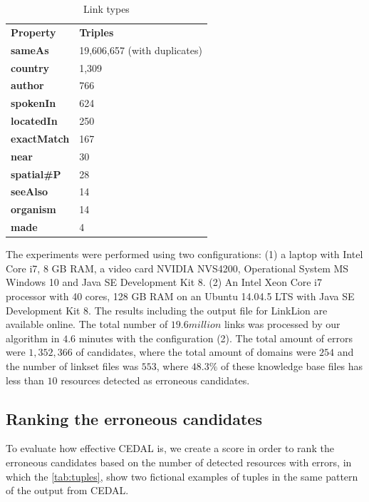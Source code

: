 \begin{table}[H]
	\centering
	\caption{Link types}
	\label{tab:linkTypes}
	\begin{tabular}{ll}
		\hline\noalign{\smallskip}
		\textbf{Property}   & \textbf{Triples}  \\
		\noalign{\smallskip}
		\hline
		\textbf{sameAs}     & 19,606,657 (with duplicates)    \\
		\textbf{country}    & 1,309                 \\
		\textbf{author}     & 766              \\
		\textbf{spokenIn}   & 624                  \\
		\textbf{locatedIn}  & 250                  \\
		\textbf{exactMatch} & 167                 \\
		\textbf{near}       & 30                   \\
		\textbf{spatial\#P} & 28                   \\
		\textbf{seeAlso}    & 14             \\
		\textbf{organism}   & 14      \\
		\textbf{made}       & 4                \\
		\hline           
	\end{tabular}
\end{table}
%
The experiments were performed using two configurations: (1) a laptop with Intel Core i7, 8 GB RAM, a video card NVIDIA NVS4200, Operational System MS Windows 10 and Java SE Development Kit 8. (2) An Intel Xeon Core i7 processor with 40 cores, 128 GB RAM on an Ubuntu 14.04.5 LTS with Java SE Development Kit 8. The results including the output file for LinkLion are available online.
The total number of $19.6 million$ links was processed by our algorithm in $4.6$ minutes with the configuration (2). The total amount of errors were $1,352,366$ of candidates, where the total amount of domains were $254$ and  the number of linkset files was $553$, where $48.3\%$ of these knowledge base files has less than $10$ resources detected as erroneous candidates. 

\subsection{Ranking the erroneous candidates}
To evaluate how effective CEDAL is, we create a score in order to rank the erroneous candidates based on the number of detected resources with errors, in which the \cref{tab:tuples}, show two fictional examples of tuples in the same pattern of the output from CEDAL.

